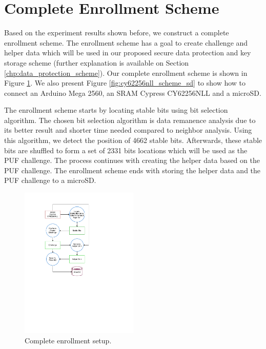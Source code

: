 \section{Complete Enrollment Scheme}
Based on the experiment results shown before, we construct a complete enrollment scheme. The enrollment scheme has a goal to create challenge and helper data which will be used in our proposed secure data protection and key storage scheme (further explanation is available on Section \ref{chp:data_protection_scheme}). Our complete enrollment scheme is shown in Figure \ref{fig:enrollment}. We also present Figure \ref{fig:cy62256nll_scheme_sd} to show how to connect an Arduino Mega 2560, an SRAM Cypress CY62256NLL and a microSD.

The enrollment scheme starts by locating stable bits using bit selection algorithm. The chosen bit selection algorithm is data remanence analysis due to its better result and shorter time needed compared to neighbor analysis. Using this algorithm, we detect the position of 4662 stable bits. Afterwards, these stable bits are shuffled to form a set of 2331 bits locations which will be used as the PUF challenge. The process continues with creating the helper data based on the PUF challenge. The enrollment scheme ends with storing the helper data and the PUF challenge to a microSD.

\begin{figure}[tph!]
    \centerline{\includegraphics[width={0.5\textwidth}]{images/enrollment}}
    \caption{Complete enrollment setup.}
    \label{fig:enrollment}
\end{figure}

